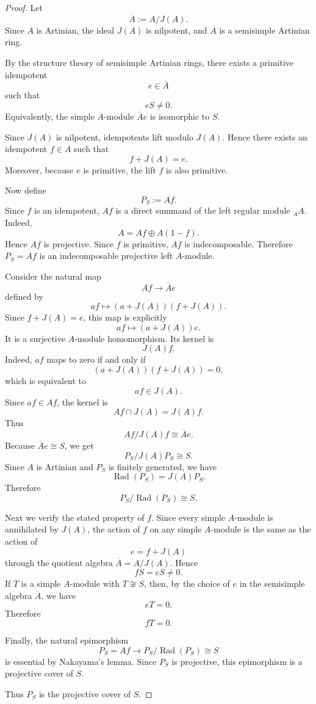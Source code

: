\begin{proof}
    Let
    \[
        \overline{A}:=A/J(A).
    \]
    Since $A$ is Artinian, the ideal $J(A)$ is nilpotent, and $\overline{A}$ is a semisimple
    Artinian ring.

    By the structure theory of semisimple Artinian rings, there exists a primitive idempotent
    \[
        e\in \overline{A}
    \]
    such that
    \[
        eS\neq 0.
    \]
    Equivalently, the simple $\overline{A}$-module $\overline{A}e$ is isomorphic to $S$.

    Since $J(A)$ is nilpotent, idempotents lift modulo $J(A)$. Hence there exists an
    idempotent $f\in A$ such that
    \[
        f+J(A)=e.
    \]
    Moreover, because $e$ is primitive, the lift $f$ is also primitive.

    Now define
    \[
        P_S:=Af.
    \]
    Since $f$ is an idempotent, $Af$ is a direct summand of the left regular module
    ${}_A A$. Indeed,
    \[
        A=Af\oplus A(1-f).
    \]
    Hence $Af$ is projective. Since $f$ is primitive, $Af$ is indecomposable. Therefore
    $P_S=Af$ is an indecomposable projective left $A$-module.

    Consider the natural map
    \[
        Af \longrightarrow \overline{A}e
    \]
    defined by
    \[
        af \longmapsto (a+J(A))(f+J(A)).
    \]
    Since $f+J(A)=e$, this map is explicitly
    \[
        af \longmapsto (a+J(A))e.
    \]
    It is a surjective $A$-module homomorphism. Its kernel is
    \[
        J(A)f.
    \]
    Indeed, $af$ maps to zero if and only if
    \[
        (a+J(A))(f+J(A))=0,
    \]
    which is equivalent to
    \[
        af\in J(A).
    \]
    Since $af\in Af$, the kernel is
    \[
        Af\cap J(A)=J(A)f.
    \]
    Thus
    \[
        Af/J(A)f\cong \overline{A}e.
    \]
    Because $\overline{A}e\cong S$, we get
    \[
        P_S/J(A)P_S\cong S.
    \]
    Since $A$ is Artinian and $P_S$ is finitely generated, we have
    \[
        \operatorname{Rad}(P_S)=J(A)P_S.
    \]
    Therefore
    \[
        P_S/\operatorname{Rad}(P_S)\cong S.
    \]

    Next we verify the stated property of $f$. Since every simple $A$-module is annihilated
    by $J(A)$, the action of $f$ on any simple $A$-module is the same as the action of
    \[
        e=f+J(A)
    \]
    through the quotient algebra $\overline{A}=A/J(A)$. Hence
    \[
        fS=eS\neq 0.
    \]
    If $T$ is a simple $A$-module with $T\not\cong S$, then, by the choice of $e$ in the
    semisimple algebra $\overline{A}$, we have
    \[
        eT=0.
    \]
    Therefore
    \[
        fT=0.
    \]

    Finally, the natural epimorphism
    \[
        P_S=Af \longrightarrow P_S/\operatorname{Rad}(P_S)\cong S
    \]
    is essential by Nakayama's lemma. Since $P_S$ is projective, this epimorphism is a
    projective cover of $S$.

    Thus $P_S$ is the projective cover of $S$.
\end{proof}

